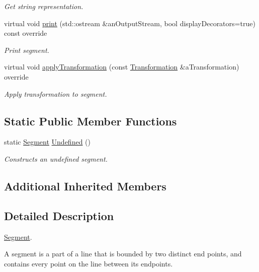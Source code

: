 \begin{DoxyCompactItemize}
\begin{DoxyCompactList}\small\item\em Get string representation. \end{DoxyCompactList}\item 
virtual void \hyperlink{classostk_1_1math_1_1geom_1_1d2_1_1objects_1_1_segment_a475ba5efb353218779018b9be88be276}{print} (std\+::ostream \&an\+Output\+Stream, bool display\+Decorators=true) const override
\begin{DoxyCompactList}\small\item\em Print segment. \end{DoxyCompactList}\item 
virtual void \hyperlink{classostk_1_1math_1_1geom_1_1d2_1_1objects_1_1_segment_afbd5fe1b8136f738a0e93b934b290394}{apply\+Transformation} (const \hyperlink{classostk_1_1math_1_1geom_1_1d2_1_1_transformation}{Transformation} \&a\+Transformation) override
\begin{DoxyCompactList}\small\item\em Apply transformation to segment. \end{DoxyCompactList}\end{DoxyCompactItemize}
\subsection*{Static Public Member Functions}
\begin{DoxyCompactItemize}
\item 
static \hyperlink{classostk_1_1math_1_1geom_1_1d2_1_1objects_1_1_segment}{Segment} \hyperlink{classostk_1_1math_1_1geom_1_1d2_1_1objects_1_1_segment_a44d3a5817296d96bf82ebbc459055025}{Undefined} ()
\begin{DoxyCompactList}\small\item\em Constructs an undefined segment. \end{DoxyCompactList}\end{DoxyCompactItemize}
\subsection*{Additional Inherited Members}


\subsection{Detailed Description}
\hyperlink{classostk_1_1math_1_1geom_1_1d2_1_1objects_1_1_segment}{Segment}. 

A segment is a part of a line that is bounded by two distinct end points, and contains every point on the line between its endpoints.

